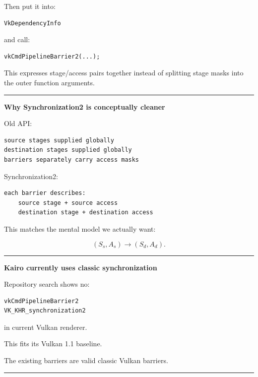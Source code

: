 Then put it into:

\begin{verbatim}
VkDependencyInfo
\end{verbatim}

and call:

\begin{verbatim}
vkCmdPipelineBarrier2(...);
\end{verbatim}

This expresses stage/access pairs together instead of splitting stage masks into the outer function arguments.

\begin{center}\rule{0.5\linewidth}{0.5pt}\end{center}

\textbf{Why Synchronization2 is conceptually cleaner}

Old API:

\begin{verbatim}
source stages supplied globally
destination stages supplied globally
barriers separately carry access masks
\end{verbatim}

Synchronization2:

\begin{verbatim}
each barrier describes:
    source stage + source access
    destination stage + destination access
\end{verbatim}

This matches the mental model we actually want:

\[
(S_s,A_s)\rightarrow(S_d,A_d).
\]

\begin{center}\rule{0.5\linewidth}{0.5pt}\end{center}

\textbf{Kairo currently uses classic synchronization}

Repository search shows no:

\begin{verbatim}
vkCmdPipelineBarrier2
VK_KHR_synchronization2
\end{verbatim}

in current Vulkan renderer.

This fits its Vulkan 1.1 baseline.

The existing barriers are valid classic Vulkan barriers.

\begin{center}\rule{0.5\linewidth}{0.5pt}\end{center}


